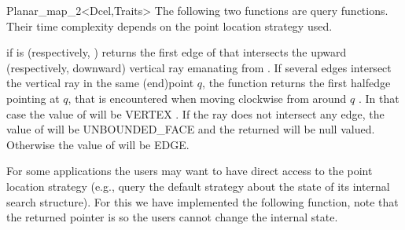 \begin{ccRefClass}{Planar_map_2<Dcel,Traits>}
The following two functions are query functions. Their time complexity
depends on the point location strategy used.

    
 {if
    is  (respectively,
   ) returns the first edge of  that
   intersects the upward (respectively, downward) vertical ray emanating
   from . If several edges intersect the vertical ray
   in the same (end)point $q$, the function returns the
   first halfedge pointing at $q$, that is encountered when moving clockwise 
   from  around $q$ . 
   In that case the value of  will
   be VERTEX . If the ray does not intersect any edge, the value 
   of  
   will be UNBOUNDED\_FACE and the 
   returned will be null
   valued. Otherwise the value of  will be EDGE.
    } 

\begin{ccAdvanced}
    For some applications the users may want to have direct access to
    the point location strategy (e.g., query the default strategy about
    the state of its internal search structure). For this we have implemented 
    the following function, note that the returned pointer is  so
    the users cannot change the internal state.



\end{ccAdvanced}
\end{ccRefClass}

